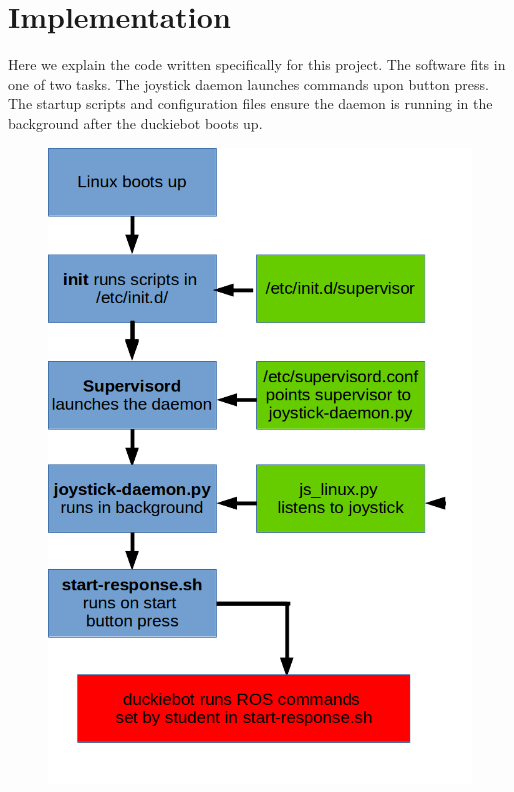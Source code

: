 \documentclass[titlepage]{article}
\begin{document}
\section{Implementation}

Here we explain the code written specifically for this project. The software fits in one of two tasks. The joystick daemon launches commands upon button press. The startup scripts and configuration files ensure the daemon is running in the background after the duckiebot boots up. 

\begin{figure}
  \centering
  \includegraphics[scale=0.422]{system_diagram.png}
\end{figure}
\end{document}
